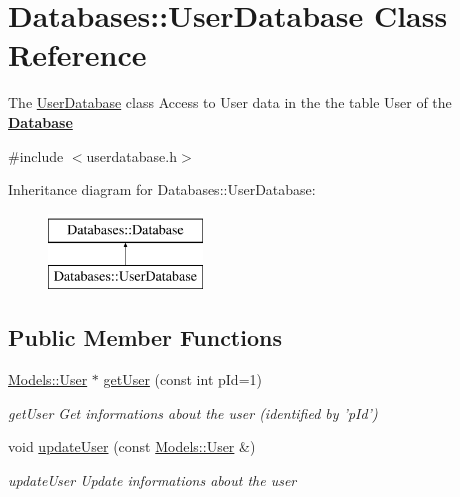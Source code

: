 \hypertarget{classDatabases_1_1UserDatabase}{\section{Databases\-:\-:User\-Database Class Reference}
\label{classDatabases_1_1UserDatabase}
}


The \hyperlink{classDatabases_1_1UserDatabase}{User\-Database} class Access to User data in the the table User of the {\bfseries \hyperlink{classDatabases_1_1Database}{Database}}  




{\ttfamily \#include $<$userdatabase.\-h$>$}

Inheritance diagram for Databases\-:\-:User\-Database\-:\begin{figure}[H]
\begin{center}
\leavevmode
\includegraphics[height=2.000000cm]{d0/d33/classDatabases_1_1UserDatabase}
\end{center}
\end{figure}
\subsection*{Public Member Functions}
\begin{DoxyCompactItemize}
\item 
\hyperlink{classModels_1_1User}{Models\-::\-User} $\ast$ \hyperlink{classDatabases_1_1UserDatabase_a476a2b649cc61870a59d6f8df0b376e4}{get\-User} (const int p\-Id=1)
\begin{DoxyCompactList}\small\item\em get\-User Get informations about the user (identified by 'p\-Id') \end{DoxyCompactList}\item 
\hypertarget{classDatabases_1_1UserDatabase_a79cd7ce66a5dc13f91a59eb106edd871}{void \hyperlink{classDatabases_1_1UserDatabase_a79cd7ce66a5dc13f91a59eb106edd871}{update\-User} (const \hyperlink{classModels_1_1User}{Models\-::\-User} \&)}\label{classDatabases_1_1UserDatabase_a79cd7ce66a5dc13f91a59eb106edd871}

\begin{DoxyCompactList}\small\item\em update\-User Update informations about the user \end{DoxyCompactList}\end{DoxyCompactItemize}
